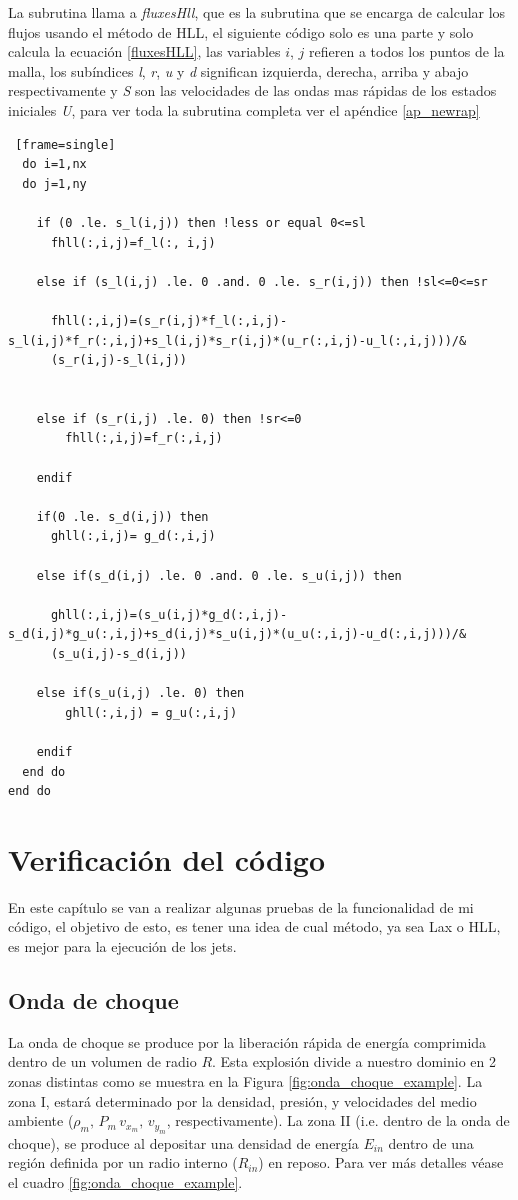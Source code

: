 \documentclass[12pt,a4paper]{book}
\begin{document}
La subrutina llama a \emph{fluxesHll}, que es la subrutina que se encarga de calcular los flujos usando el método de HLL, el siguiente código solo es una parte
y solo calcula la ecuación \ref{fluxesHLL}, las variables $i$, $j$ refieren a todos los puntos de la malla, los subíndices \emph{l}, \emph{r}, \emph{u} y \emph{d}
significan izquierda, derecha, arriba y abajo respectivamente y \emph{S} son las velocidades de las ondas mas rápidas de los estados iniciales \emph{U}, 
para ver toda la subrutina completa ver el apéndice \ref{ap_newrap}

\begin{lstlisting} [frame=single]
  do i=1,nx
  do j=1,ny
    
    if (0 .le. s_l(i,j)) then !less or equal 0<=sl
      fhll(:,i,j)=f_l(:, i,j)

    else if (s_l(i,j) .le. 0 .and. 0 .le. s_r(i,j)) then !sl<=0<=sr
  
      fhll(:,i,j)=(s_r(i,j)*f_l(:,i,j)-s_l(i,j)*f_r(:,i,j)+s_l(i,j)*s_r(i,j)*(u_r(:,i,j)-u_l(:,i,j)))/&
      (s_r(i,j)-s_l(i,j))


    else if (s_r(i,j) .le. 0) then !sr<=0
        fhll(:,i,j)=f_r(:,i,j)

    endif

    if(0 .le. s_d(i,j)) then
      ghll(:,i,j)= g_d(:,i,j)

    else if(s_d(i,j) .le. 0 .and. 0 .le. s_u(i,j)) then

      ghll(:,i,j)=(s_u(i,j)*g_d(:,i,j)-s_d(i,j)*g_u(:,i,j)+s_d(i,j)*s_u(i,j)*(u_u(:,i,j)-u_d(:,i,j)))/&
      (s_u(i,j)-s_d(i,j))

    else if(s_u(i,j) .le. 0) then
        ghll(:,i,j) = g_u(:,i,j)

    endif
  end do
end do
\end{lstlisting}



\chapter{Verificación del código}

En este capítulo se van a realizar algunas pruebas de la funcionalidad de mi código, el objetivo de esto, es tener una idea de cual método, ya sea Lax o HLL, es mejor para la ejecución de los jets.

\section{Onda de choque} \label{sec:onda de choque}%
La onda de choque se produce por la liberación rápida de energía comprimida dentro de un volumen de radio $R$. Esta explosión divide a nuestro dominio en 2 zonas distintas como se muestra en la Figura \ref{fig:onda_choque_example}. La zona I, estará determinado por la densidad, presión, y velocidades del medio ambiente ($\rho_m, \, P_m\, v_{x_m}, \, v_{y_m}$, respectivamente). La zona II (i.e. dentro de la onda de choque), se produce al depositar una densidad de energía $E_{in}$ dentro de una región definida por un radio interno ($R_{in}$) en reposo. Para ver más detalles véase el cuadro \ref{fig:onda_choque_example}.
\end{document}
